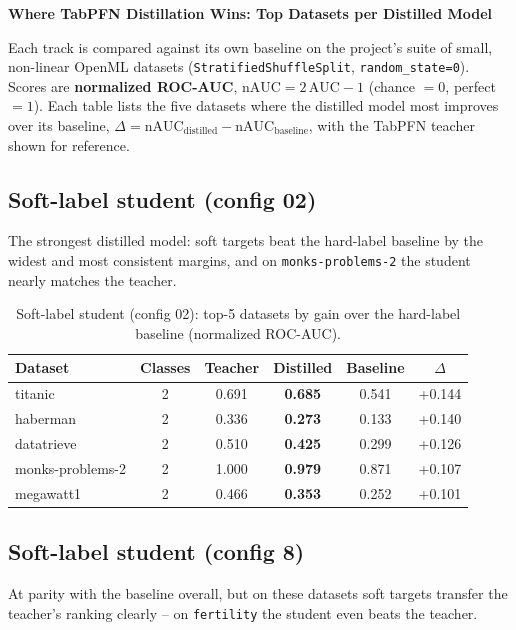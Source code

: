 \documentclass[10pt]{article}
\begin{document}
\begin{center}
{\large\bfseries Where TabPFN Distillation Wins: Top Datasets per Distilled Model}
\end{center}

\noindent
Each track is compared against its own baseline on the project's suite of small, non-linear
OpenML datasets (\texttt{StratifiedShuffleSplit}, \texttt{random\_state=0}). Scores are
\textbf{normalized ROC-AUC}, $\mathrm{nAUC} = 2\,\mathrm{AUC} - 1$ (chance $=0$, perfect $=1$).
Each table lists the five datasets where the distilled model most improves over its baseline,
$\Delta = \mathrm{nAUC}_{\text{distilled}} - \mathrm{nAUC}_{\text{baseline}}$, with the
TabPFN teacher shown for reference.

\subsection*{Soft-label student (config 02)}
The strongest distilled model: soft targets beat the hard-label baseline by the widest and most consistent margins, and on \texttt{monks-problems-2} the student nearly matches the teacher.

\begin{table}[!ht]
\centering\small
\caption{Soft-label student (config 02): top-5 datasets by gain over the hard-label baseline (normalized ROC-AUC).}
\label{tab:student02}
\begin{tabular}{lccccc}
\toprule
Dataset & Classes & Teacher & Distilled & Baseline & $\Delta$ \\
\midrule
titanic & 2 & 0.691 & \textbf{0.685} & 0.541 & +0.144 \\
haberman & 2 & 0.336 & \textbf{0.273} & 0.133 & +0.140 \\
datatrieve & 2 & 0.510 & \textbf{0.425} & 0.299 & +0.126 \\
monks-problems-2 & 2 & 1.000 & \textbf{0.979} & 0.871 & +0.107 \\
megawatt1 & 2 & 0.466 & \textbf{0.353} & 0.252 & +0.101 \\
\bottomrule
\end{tabular}
\end{table}

\subsection*{Soft-label student (config 8)}
At parity with the baseline overall, but on these datasets soft targets transfer the teacher's ranking clearly -- on \texttt{fertility} the student even beats the teacher.
\end{document}
